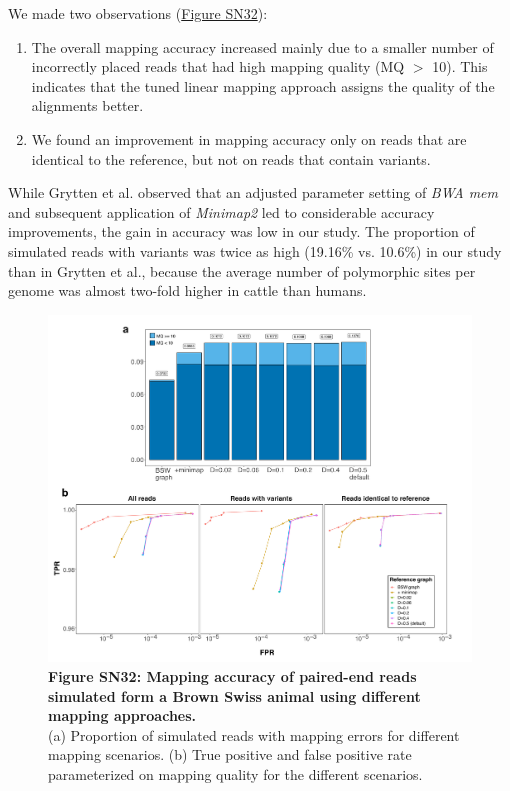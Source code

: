 \documentclass[../main.tex]{subfiles}
\begin{document}
\begin{flushleft}
\bigskip

We made two observations (\hyperlink{Figure SN32}{Figure SN32}):
\begin{enumerate}
    \item The overall mapping accuracy increased mainly due to a smaller number of incorrectly placed reads that had high mapping quality (MQ $>$ 10). This indicates that the tuned linear mapping approach assigns the quality of the alignments better.
    \item We found an improvement in mapping accuracy only on reads that are identical to the reference, but not on reads that contain variants.
\end{enumerate}

\bigskip

While Grytten et al. observed that an adjusted parameter setting of \emph{BWA mem} and subsequent application of \emph{Minimap2} led to considerable accuracy improvements, the gain in accuracy was low in our study. The proportion of simulated reads with variants was twice as high (19.16\% vs. 10.6\%) in our study than in Grytten et al., because the average number of polymorphic sites per genome was almost two-fold higher in cattle than humans.

\begin{figure}[!htb]
    \centering
    \includegraphics[width=\textwidth]{paper2/supplement/roc_tuned_comb.pdf}
    \caption*{\textbf{\hypertarget{Figure SN32}{Figure SN32}: Mapping accuracy of paired-end reads simulated form a Brown Swiss
    animal using different mapping approaches.} \\
    \small{(a) Proportion of simulated reads with mapping errors for different mapping scenarios. (b) True positive and false positive rate parameterized on mapping quality for the different scenarios.}}
\end{figure}


\end{flushleft}
\end{document}
